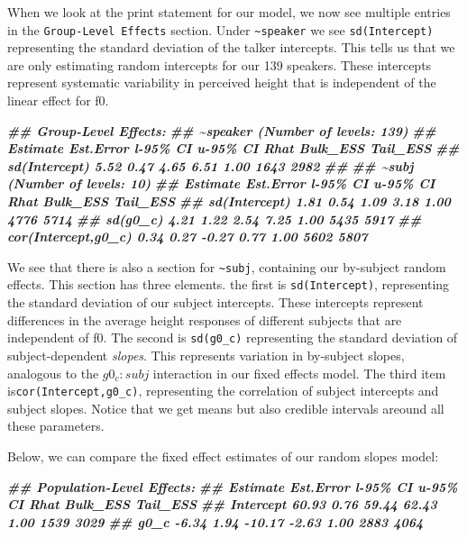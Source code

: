 \documentclass[
]{book}
\newenvironment{Shaded}{\begin{snugshade}}{\end{snugshade}}
\newcommand{\DocumentationTok}[1]{\textcolor[rgb]{0.56,0.35,0.01}{\textbf{\textit{#1}}}}
\begin{document}
When we look at the print statement for our model, we now see multiple entries in the \texttt{Group-Level\ Effects} section. Under \texttt{\textasciitilde{}speaker} we see \texttt{sd(Intercept)} representing the standard deviation of the talker intercepts. This tells us that we are only estimating random intercepts for our 139 speakers. These intercepts represent systematic variability in perceived height that is independent of the linear effect for f0.

\begin{Shaded}
\begin{Highlighting}[]
\DocumentationTok{\#\# Group{-}Level Effects: }
\DocumentationTok{\#\# \textasciitilde{}speaker (Number of levels: 139) }
\DocumentationTok{\#\#               Estimate Est.Error l{-}95\% CI u{-}95\% CI Rhat Bulk\_ESS Tail\_ESS}
\DocumentationTok{\#\# sd(Intercept)     5.52      0.47     4.65     6.51 1.00     1643     2982}
\DocumentationTok{\#\# }
\DocumentationTok{\#\# \textasciitilde{}subj (Number of levels: 10) }
\DocumentationTok{\#\#                     Estimate Est.Error l{-}95\% CI u{-}95\% CI Rhat Bulk\_ESS Tail\_ESS}
\DocumentationTok{\#\# sd(Intercept)           1.81      0.54     1.09     3.18 1.00     4776     5714}
\DocumentationTok{\#\# sd(g0\_c)                4.21      1.22     2.54     7.25 1.00     5435     5917}
\DocumentationTok{\#\# cor(Intercept,g0\_c)     0.34      0.27    {-}0.27     0.77 1.00     5602     5807}
\end{Highlighting}
\end{Shaded}

We see that there is also a section for \texttt{\textasciitilde{}subj}, containing our by-subject random effects. This section has three elements. the first is \texttt{sd(Intercept)}, representing the standard deviation of our subject intercepts. These intercepts represent differences in the average height responses of different subjects that are independent of f0. The second is \texttt{sd(g0\_c)} representing the standard deviation of subject-dependent \emph{slopes}. This represents variation in by-subject slopes, analogous to the \(g0_c \colon subj\) interaction in our fixed effects model. The third item is\texttt{cor(Intercept,g0\_c)}, representing the correlation of subject intercepts and subject slopes. Notice that we get means but also credible intervals areound all these parameters.

Below, we can compare the fixed effect estimates of our random slopes model:

\begin{Shaded}
\begin{Highlighting}[]
\DocumentationTok{\#\# Population{-}Level Effects: }
\DocumentationTok{\#\#           Estimate Est.Error l{-}95\% CI u{-}95\% CI Rhat Bulk\_ESS Tail\_ESS}
\DocumentationTok{\#\# Intercept    60.93      0.76    59.44    62.43 1.00     1539     3029}
\DocumentationTok{\#\# g0\_c         {-}6.34      1.94   {-}10.17    {-}2.63 1.00     2883     4064}
\end{Highlighting}
\end{Shaded}
\end{document}
